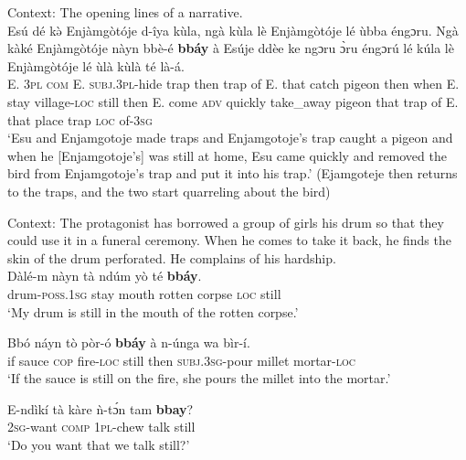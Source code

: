 \begin{exe}
	\ex\label{exAppendixKaba1}
	Context: The opening lines of a narrative.\\
	\gll Esú dé kə̀ Enjàmgòtóje d-îya kùla, ngà kùla lè Enjàmgòtóje lé ùbba éngɔru. Ngà kàké Enjàmgòtóje nàyn bbè-é \textbf{bbáy} à Esúje ddèe ke ngɔru ɔ̀ru éngɔrú lé kúla lè Enjàmgòtóje lé ùlà kùlà té là-á.\\
E. 3\textsc{pl} \textsc{com} E. \textsc{subj}.3\textsc{pl}-hide trap then trap of E. that catch pigeon then when E. stay village-\textsc{loc} still then E. come \textsc{adv} quickly take\_away pigeon that trap of E. that place trap \textsc{loc} of-3\textsc{sg}\\
\glt \lq Esu and Enjamgotoje made traps and Enjamgotoje's trap caught a pigeon and when he [Enjamgotoje's] was still at home, Esu came quickly and removed the bird from Enjamgotoje's trap and put it into his trap.' (Ejamgoteje then returns to the traps, and the two start quarreling about the bird) \parencite[435]{Moser2004}

	\ex\label{exAppendixKaba2}
	Context: The protagonist has borrowed a group of girls his drum so that they could use it in a funeral ceremony. When he comes to take it back, he finds the skin of the drum perforated. He complains of his hardship.\\
	\gll Dàlé-m nàyn tà ndúm yò té \textbf{bbáy}.\\
	drum-\textsc{poss}.1\textsc{sg} stay mouth rotten corpse \textsc{loc} still\\
	\glt \lq My drum is still in the mouth of the rotten corpse.' \parencite[446]{Moser2004}
	
	\ex\label{exAppendixKaba3}
	\gll Bbó náyn tò pòr-ó \textbf{bbáy} à n-únga wa bìr-í.\\
	if sauce \textsc{cop} fire-\textsc{loc} still then \textsc{subj}.3\textsc{sg}-pour millet mortar-\textsc{loc}\\
	\glt \lq If the sauce is still on the fire, she pours the millet into the mortar.'  \parencite[296]{Moser2004}
	
	\ex\label{exAppendixKaba4}
	\gll  E-ndìkí {tà kàre} ǹ-tɔ́n tam \textbf{bbay}?\\
	2\textsc{sg}-want \textsc{comp} 1\textsc{pl}-chew talk still\\
	\glt \lq Do you want that we talk still?\rq{ }\parencite[381]{Moser2004}
\end{exe}

